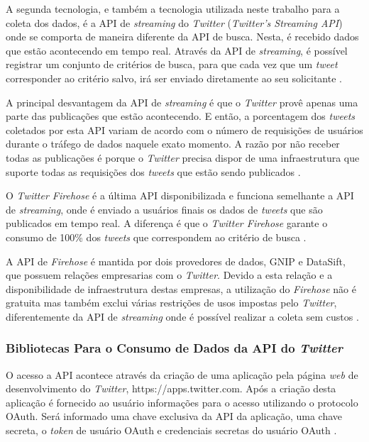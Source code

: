 A segunda tecnologia, e também a tecnologia utilizada neste trabalho para a coleta dos dados, é a API de \textit{streaming} do \textit{Twitter} (\textit{Twitter's Streaming API}) onde se comporta de maneira diferente da API de busca. Nesta, é recebido dados que estão acontecendo em tempo real. Através da API de \textit{streaming}, é possível registrar um conjunto de critérios de busca, para que cada vez que um \textit{tweet} corresponder ao critério salvo, irá ser enviado diretamente ao seu solicitante \cite{twitter-doc}.

A principal desvantagem da API de \textit{streaming} é que o \textit{Twitter} provê apenas uma parte das publicações que estão acontecendo. E então, a porcentagem dos \textit{tweets} coletados por esta API variam de acordo com o número de requisições de usuários durante o tráfego de dados naquele exato momento. A razão por não receber todas as publicações é porque o \textit{Twitter} precisa dispor de uma infraestrutura que suporte todas as requisições dos \textit{tweets} que estão sendo publicados \cite{twitter1}.

O \textit{Twitter Firehose} é a última API disponibilizada e funciona semelhante a API de \textit{streaming}, onde é enviado a usuários finais os dados de \textit{tweets} que são publicados em tempo real. A diferença é que o \textit{Twitter Firehose} garante o consumo de 100\% dos \textit{tweets} que correspondem ao critério de busca \cite{twitter-doc}.

A API de \textit{Firehose} é mantida por dois provedores de dados, GNIP e DataSift, que possuem relações empresarias com o \textit{Twitter}. Devido a esta relação e a disponibilidade de infraestrutura destas empresas, a utilização do \textit{Firehose} não é gratuita mas também exclui várias restrições de usos impostas pelo \textit{Twitter}, diferentemente da API de \textit{streaming} onde é possível realizar a coleta sem custos \cite{twitter1}.

\subsubsection{Bibliotecas Para o Consumo de Dados da API do \textit{Twitter}}
O acesso a API acontece através da criação de uma aplicação pela página \textit{web} de desenvolvimento do \textit{Twitter}, https://apps.twitter.com. Após a criação desta aplicação é fornecido ao usuário informações para o acesso utilizando o protocolo OAuth. Será informado uma chave exclusiva da API da aplicação, uma chave secreta, o \textit{token} de usuário OAuth e credenciais secretas do usuário OAuth \cite{mining-social-web}.

